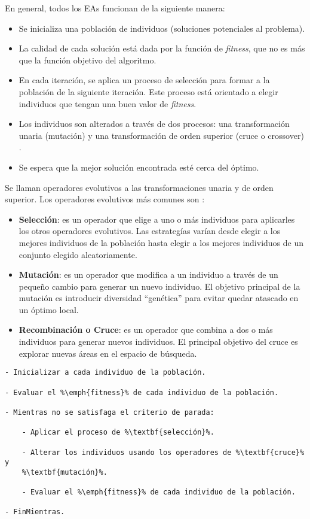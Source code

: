     En general, todos los EAs funcionan de la siguiente manera:
\begin{itemize}
    \item Se inicializa una población de individuos (soluciones potenciales al
problema).
    \item La calidad de cada solución está dada por la función de
\emph{fitness}, que no es más que la función objetivo del algoritmo.
    \item En cada iteración, se aplica un proceso de selección para formar a la
población de la siguiente iteración. Este proceso está orientado a elegir
individuos que tengan una buen valor de \emph{fitness}.
    \item Los individuos son alterados a través de dos procesos: una
transformación unaria (mutación) y una transformación de orden superior (cruce o
crossover) \cite{PSO_0}.
    \item Se espera que la mejor solución encontrada esté cerca del óptimo.
\end{itemize}

    Se llaman operadores evolutivos a las transformaciones unaria y de orden
superior. Los operadores evolutivos más comunes son \cite{PSO_0}:
\begin{itemize}
    \item \textbf{Selección}: es un operador que elige a uno o más individuos para
aplicarles los otros operadores evolutivos. Las estrategías varían desde elegir
a los mejores individuos de la población hasta elegir a los mejores individuos
de un conjunto elegido aleatoriamente.
    \item \textbf{Mutación}: es un operador que modifica a un individuo a través
de un pequeño cambio para generar un nuevo individuo. El objetivo principal de
la mutación es introducir diversidad ``genética'' para evitar quedar atascado en
un óptimo local.
    \item \textbf{Recombinación o Cruce}: es un operador que combina a dos o más
individuos para generar nuevos individuos. El principal objetivo del cruce es
explorar nuevas áreas en el espacio de búsqueda.
    
\end{itemize}

\begin{lstlisting}[float=h, caption=Algoritmo Evolutivo General]
- Inicializar a cada individuo de la población.

- Evaluar el %\emph{fitness}% de cada individuo de la población.

- Mientras no se satisfaga el criterio de parada:

    - Aplicar el proceso de %\textbf{selección}%.

    - Alterar los individuos usando los operadores de %\textbf{cruce}% y
    %\textbf{mutación}%.

    - Evaluar el %\emph{fitness}% de cada individuo de la población.

- FinMientras.

\end{lstlisting}

